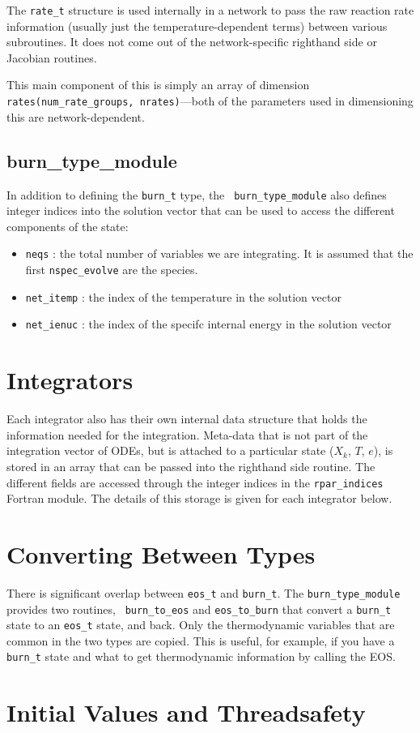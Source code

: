 The {\tt rate\_t} structure is used internally in a network to pass
the raw reaction rate information (usually just the
temperature-dependent terms) between various subroutines.  It does not
come out of the network-specific righthand side or Jacobian routines.

This main component of this is simply an array of dimension {\tt
  rates(num\_rate\_groups, nrates)}---both of the parameters
used in dimensioning this are network-dependent.


\subsection{{burn\_type\_module}}

In addition to defining the {\tt burn\_t} type, the {\tt
  burn\_type\_module} also defines integer indices into the solution
vector that can be used to access the different components of the
state:
\begin{itemize}
  \item {\tt neqs} : the total number of variables we are integrating.
    It is assumed that the first {\tt nspec\_evolve} are the species.

  \item {\tt net\_itemp} : the index of the temperature in the
    solution vector

  \item {\tt net\_ienuc} : the index of the specifc internal energy
    in the solution vector
\end{itemize}

\section{Integrators}

Each integrator also has their own internal data structure that holds
the information needed for the integration.  Meta-data that is not
part of the integration vector of ODEs, but is attached to a
particular state ($X_k$, $T$, $e$), is stored in an array that can be
passed into the righthand side routine.  The different fields are
accessed through the integer indices in the {\tt rpar\_indices}
Fortran module.  The details of this storage is given for each
integrator below.


\section{Converting Between Types}

There is significant overlap between {\tt eos\_t} and {\tt burn\_t}.
The {\tt burn\_type\_module} provides two routines, {\tt
  burn\_to\_eos} and {\tt eos\_to\_burn} that convert a {\tt burn\_t}
state to an {\tt eos\_t} state, and back.  Only the thermodynamic
variables that are common in the two types are copied.  This is
useful, for example, if you have a {\tt burn\_t} state and what to get
thermodynamic information by calling the EOS.


\section{Initial Values and Threadsafety}

